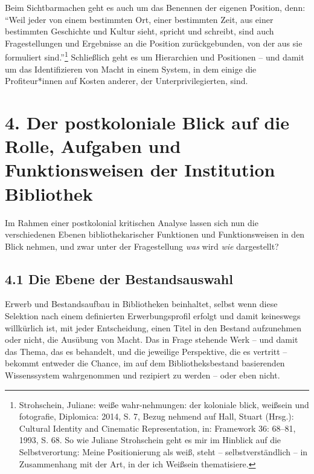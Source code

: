 \documentclass[a4paper,
fontsize=11pt,
oneside,
numbers=noperiodatend,
parskip=half-,
bibliography=totoc,
final
]{scrartcl}
\begin{document}
Beim Sichtbarmachen geht es auch um das Benennen der eigenen Position,
denn: \enquote{Weil jeder von einem bestimmten Ort, einer bestimmten
Zeit, aus einer bestimmten Geschichte und Kultur sieht, spricht und
schreibt, sind auch Fragestellungen und Ergebnisse an die Position
zurückgebunden, von der aus sie formuliert sind.}\footnote{Strohschein,
  Juliane: weiße wahr-nehmungen: der koloniale blick, weißsein und
  fotografie, Diplomica: 2014, S. 7, Bezug nehmend auf Hall, Stuart
  (Hrsg.): Cultural Identity and Cinematic Representation, in: Framework
  36: 68--81, 1993, S. 68. So wie Juliane Strohschein geht es mir im
  Hinblick auf die Selbstverortung: Meine Positionierung als weiß, steht
  -- selbstverständlich -- in Zusammenhang mit der Art, in der ich
  Weißsein thematisiere.} Schließlich geht es um Hierarchien und
Positionen -- und damit um das Identifizieren von Macht in einem System,
in dem einige die Profiteur*innen auf Kosten anderer, der
Unterprivilegierten, sind.

\hypertarget{der-postkoloniale-blick-auf-die-rolle-aufgaben-und-funktionsweisen-der-institution-bibliothek}{%
\section{4. Der postkoloniale Blick auf die Rolle, Aufgaben und
Funktionsweisen der Institution
Bibliothek}\label{der-postkoloniale-blick-auf-die-rolle-aufgaben-und-funktionsweisen-der-institution-bibliothek}}

Im Rahmen einer postkolonial kritischen Analyse lassen sich nun die
verschiedenen Ebenen bibliothekarischer Funktionen und Funktionsweisen
in den Blick nehmen, und zwar unter der Fragestellung \emph{was} wird
\emph{wie} dargestellt?

\hypertarget{die-ebene-der-bestandsauswahl}{%
\subsection{4.1 Die Ebene der
Bestandsauswahl}\label{die-ebene-der-bestandsauswahl}}

Erwerb und Bestandsaufbau in Bibliotheken beinhaltet, selbst wenn diese
Selektion nach einem definierten Erwerbungsprofil erfolgt und damit
keineswegs willkürlich ist, mit jeder Entscheidung, einen Titel in den
Bestand aufzunehmen oder nicht, die Ausübung von Macht. Das in Frage
stehende Werk -- und damit das Thema, das es behandelt, und die
jeweilige Perspektive, die es vertritt -- bekommt entweder die Chance,
im auf dem Bibliotheksbestand basierenden Wissenssystem wahrgenommen und
rezipiert zu werden -- oder eben nicht.
\end{document}
